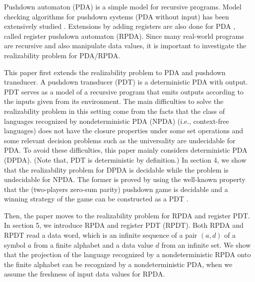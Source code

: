 Pushdown automaton (PDA) is a simple model for recursive programs.
Model checking algorithms for pushdown systems (PDA without input)
has been extensively studied \cite{Gr67,Wa96,BEM97,EHRS00,EKS01}.
Extensions by adding registers are also done for PDA \cite{CL15,MRT17,STS21},
called register pushdown automaton (RPDA).
Since many real-world programs are recursive and also manipulate data values,
it is important to investigate the realizability problem for PDA/RPDA.
\medskip\par
This paper first extends the realizability problem to PDA and pushdown transducer.
A pushdown transducer (PDT) is a deterministic PDA with output.
PDT serves as a model of a recursive program that emits outputs
according to the inputs given from its environment.
The main difficulties to solve the realizability problem in this setting
come from the facts that
the class of languages recognized by nondeterministic PDA (NPDA) (i.e., context-free languages)
does not have the closure properties under some set operations and
some relevant decision problems such as the universality are undecidable for PDA.
To avoid these difficulties, this paper mainly considers deterministic PDA (DPDA).
(Note that, PDT is deterministic by definition.)
In section 4, we show that the realizability problem for DPDA is decidable
while the problem is undecidable for NPDA.
The former is proved by using the well-known property that
the (two-players zero-sum parity) pushdown game is decidable and
a winning strategy of the game can be constructed as a PDT \cite{Wa96}.

Then, the paper moves to the realizability problem for RPDA and register PDT.
In section 5, we introduce RPDA and register PDT (RPDT).
Both RPDA and RPDT read a data word, which is an infinite sequence of
a pair $(a,d)$ of a symbol $a$ from a finite alphabet and a data value $d$ from
an infinite set.
We show that the projection of the language recognized by a nondeterministic RPDA
onto the finite alphabet can be recognized by a nondeterministic PDA,
when we assume the freshness of input data values \cite{Tz10} for RPDA.

